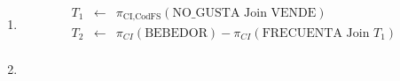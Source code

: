 \documentclass[12pt]{article}
\newcommand{\asig}{\ensuremath{\leftarrow}}
\begin{document}
\begin{enumerate}
 \item 

\begin{eqnarray*}
 T_1 & \asig & \pi_{\text{CI,CodFS}}(\text{NO\_GUSTA} \text{ Join } \text{VENDE}) \\
 T_2 & \asig & \pi_{CI}(\text{BEBEDOR}) - \pi_{CI}(\text{FRECUENTA} \text{ Join } T_1) \\
\end{eqnarray*}

 \item 

\end{enumerate}
\end{document}
